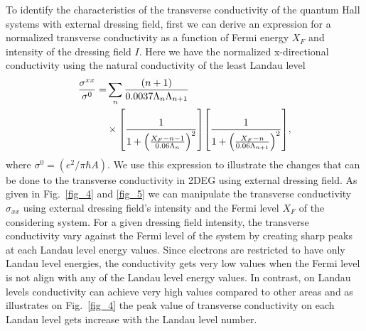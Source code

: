
To identify the characteristics of the transverse conductivity of the quantum Hall systems with external dressing field, first we can derive an expression for a normalized
transverse conductivity as a function of Fermi energy $X_F$ and intensity of the dressing field $I$. Here we have the normalized x-directional conductivity using the natural conductivity of the least Landau level
\begin{equation} \label{eq_35}
  \begin{aligned}
    \frac{\sigma^{xx}}{\sigma^{0}} = &
    \sum_{n}
    \frac{\qty(n+1)}{0.0037\Lambda_n \Lambda_{n+1}} \\
    & \times
    \qty[
      \frac{1}
      {
        1 + \qty(\frac{X_F - n -1}{0.06\Lambda_n})^2
      }
    ]
    \qty[
      \frac{1}
      {
        1 + \qty(\frac{X_F - n}{0.06\Lambda_{n+1}})^2
      }
    ],
  \end{aligned}
\end{equation}
where $\sigma^0 = (e^2/\pi \hbar A)$. We use this expression to illustrate the changes that can be done to the transverse conductivity in 2DEG using external dressing field. As given in Fig.~\ref{fig_4} and \ref{fig_5} we can manipulate the transverse conductivity $\sigma_{xx}$ using external dressing field's intensity and the Fermi level $X_F$ of the considering system. For a given dressing field intensity, the transverse conductivity vary against the Fermi level of the system by creating sharp peaks at each Landau level energy values. Since electrons are restricted to have only Landau level energies, the conductivity gets very low values when the Fermi level is not align with any of the Landau level energy values. In contrast, on Landau levels conductivity can achieve very high values compared to other areas and as illustrates on Fig.~\ref{fig_4} the peak value of transverse conductivity on each Landau level gets increase with the Landau level number.

